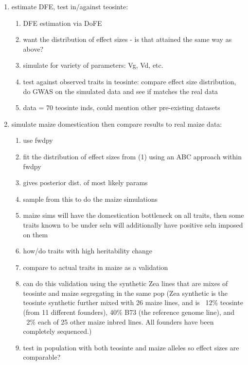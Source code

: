 \documentclass[10pt, letterpaper]{article}
\begin{document}
\begin{enumerate}

\item estimate DFE, test in\//against teosinte:

	\begin{enumerate}
	
	\item DFE estimation via DoFE
	\item want the distribution of effect sizes - is that attained the same way as above?
	\item simulate for variety of parameters: Vg, Vd, etc.
	\item test against observed traits in teosinte: compare effect size distribution, do GWAS on the simulated data and see if matches the real data
	\item data = 70 teosinte inds, could mention other pre-existing datasets

	\end{enumerate}

\item simulate maize domestication then compare results to real maize data:

	\begin{enumerate}
	
	\item use fwdpy
	\item fit the distribution of effect sizes from (1) using an ABC approach within fwdpy
	\item gives posterior dist. of most likely params
	\item sample from this to do the maize simulations
	\item maize sims will have the domestication bottleneck on all traits, then some traits known to be under seln will additionally have positive seln imposed on them
	\item how\//do traits with high heritability change
	\item compare to actual traits in maize as a validation
	\item can do this validation using the synthetic Zea lines that are mixes of teosinte and maize segregating in the same pop \small{(Zea synthetic is the teosinte synthetic further mixed with 26 maize lines, and is ~12\% teosinte (from 11 different founders), 40\% B73 (the reference genome line), and ~2\% each of 25 other maize inbred lines.  All founders have been completely sequenced.)}
	\item test in population with both teosinte and maize alleles so effect sizes are comparable?


\end{enumerate}
\end{enumerate}
\end{document}

